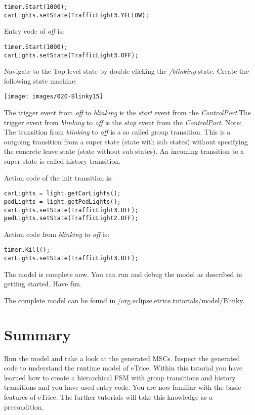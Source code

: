 \begin{verbatim}
timer.Start(1000);
carLights.setState(TrafficLight3.YELLOW); 
\end{verbatim}

 
Entry code  of \textit{off} is:

\begin{verbatim}
timer.Start(1000);
carLights.setState(TrafficLight3.OFF);
\end{verbatim}

Navigate to the Top level state by double clicking the \textit{/blinking} state. Create the following state machine:

\texttt{[image: images/020-Blinky15]}

The trigger event from \textit{off} to \textit{blinking} is the \textit{start} event from the \textit{ControlPort}.The trigger event from \textit{blinking} to \textit{off} is the \textit{stop} event from the \textit{ControlPort}.
Note: The transition from \textit{blinking} to \textit{off} is a so called group transition. This is a outgoing transition from a super state (state with sub states) without specifying the concrete leave state (state without sub states). An incoming transition to a super state is called history transition.   

Action code of the init transition is:

\begin{verbatim}
carLights = light.getCarLights();
pedLights = light.getPedLights();
carLights.setState(TrafficLight3.OFF);
pedLights.setState(TrafficLight2.OFF);
\end{verbatim}

Action code from \textit{blinking} to \textit{off} is:

\begin{verbatim}
timer.Kill();
carLights.setState(TrafficLight3.OFF); 
\end{verbatim}

The model is complete now. You can run and debug the model as described in getting started. Have fun.

The complete model can be found in /org.eclipse.etrice.tutorials/model/Blinky.

\section{Summary}

Run the model and take a look at the generated MSCs. Inspect the generated code to understand the runtime model of eTrice. Within this tutorial you have learned how to create a hierarchical FSM with group transitions and history transitions and you have used entry code. You are now familiar with the basic features of eTrice. The further tutorials will take this knowledge as a precondition.
